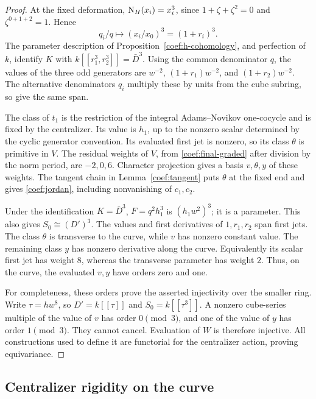 \begin{proof}
At the fixed deformation,
\(\operatorname{N}_H(x_i)=x_i^3\), since \(1+\zeta+\zeta^2=0\) and
\(\zeta^{0+1+2}=1\).  Hence
\[
 q_i/q\longmapsto (x_i/x_0)^3=(1+r_i)^3.
\]
The parameter description of
Proposition~\ref{coef:h-cohomology}, and perfection of \(k\), identify
\(K\) with \(k[[r_1^3,r_2^3]]=\bar D^3\).
Using the common denominator \(q\), the values of the three odd
generators are \(w^{-2}\), \((1+r_1)w^{-2}\), and
\((1+r_2)w^{-2}\).  The alternative denominators \(q_i\) multiply
these by units from the cube subring, so give the same span.

The class of \(t_1\) is the restriction of the integral
Adams--Novikov one-cocycle and is fixed by the centralizer.
Its value is \(h_1\), up to the nonzero scalar determined by the
cyclic generator convention.  Its evaluated first jet is nonzero,
so its class \(\theta\) is primitive in \(V\).
The residual weights of \(V\), from
\eqref{coef:final-graded} after division by the norm period, are
\(-2,0,6\).  Character projection gives a basis \(v,\theta,y\)
of these weights.  The tangent chain in
Lemma~\ref{coef:tangent} puts \(\theta\) at the fixed end and gives
\eqref{coef:jordan}, including nonvanishing of \(c_1,c_2\).

Under the identification \(K=\bar D^3\),
\(F=q^2h_1^3\) is \((h_1w^2)^3\); it is a parameter.
This also gives \(S_0\cong(D')^3\).
The values and first derivatives of \(1,r_1,r_2\) span first jets.
The class \(\theta\) is transverse to the curve, while \(v\) has
nonzero constant value.  The remaining class \(y\) has nonzero
derivative along the curve.  Equivalently its scalar first jet has
weight \(8\), whereas the transverse parameter has weight \(2\).
Thus, on the curve, the evaluated \(v,y\) have orders zero and one.

For completeness, these orders prove the asserted injectivity over
the smaller ring.  Write \(\tau=hw^8\), so
\(D'=k[[\tau]]\) and \(S_0=k[[\tau^3]]\).
A nonzero cube-series multiple of the value of \(v\) has order
\(0\pmod3\), and one of the value of \(y\) has order \(1\pmod3\).
They cannot cancel.  Evaluation of \(W\) is therefore injective.
All constructions used to define it are functorial for the
centralizer action, proving equivariance.
\end{proof}

\subsection{Centralizer rigidity on the curve}

